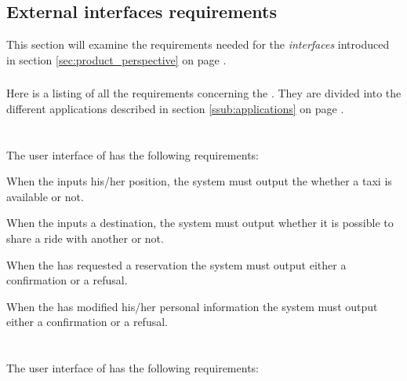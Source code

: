 
\subsection{External interfaces requirements} %
\label{sec:External Interfaces}

This section will examine the requirements needed for the \emph{interfaces} introduced in section \ref{sec:product_perspective} on page \pageref{sec:product_perspective}.



\subsubsection{} %
Here is a listing of all the requirements concerning the . They are divided into the different applications described in section \ref{ssub:applications} on page \pageref{ssub:applications}.

\paragraph{} \hfill \\
The user interface of  has the following requirements:

\begin{enumerate} [label = \textbf{[IR\arabic*]}]

\item When the  inputs his/her position, the system must output the whether a taxi is available or not.

\item When the  inputs a destination, the system must output whether it is possible to share a ride with another  or not.

\item When the  has requested a reservation the system must output either a confirmation or a refusal.

\item When the  has modified his/her personal information the system must output either a confirmation or a refusal.



\end{enumerate} 

\paragraph{} \hfill \\
The user interface of  has the following requirements:

